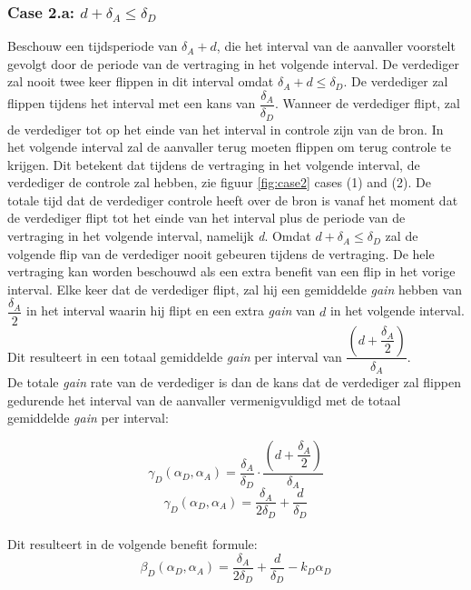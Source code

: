 \documentclass[master=cws, masteroption=vs,english]{kulemt}
\begin{document}
\begin{abstract*}
\subsubsection*{\textbf{Case 2.a:} $d + \delta_{A} \leq \delta_{D}$}
Beschouw een tijdsperiode van $\delta_{A} + d$, die het interval van de aanvaller voorstelt gevolgt door de periode van de vertraging in het volgende interval. De verdediger zal nooit twee keer flippen in dit interval omdat  $\delta_{A} + d \leq \delta_{D}$. De verdediger zal flippen tijdens het interval met een kans van $\dfrac{\delta_{A}}{\delta_{D}} $. Wanneer de verdediger flipt, zal de verdediger tot op het einde van het interval in controle zijn van de bron. In het volgende interval zal de aanvaller terug moeten flippen om terug controle te krijgen. Dit betekent dat tijdens de vertraging in het volgende interval, de verdediger de controle zal hebben, zie figuur  \ref{fig:case2} cases (1) and (2). De totale tijd dat de verdediger controle heeft over de bron is vanaf het moment dat de verdediger flipt tot het einde van het interval plus de periode van de vertraging in het volgende interval, namelijk \textit{d}. Omdat $d + \delta_{A} \leq \delta_{D}$  zal de volgende flip van de verdediger nooit gebeuren tijdens de vertraging. De hele vertraging kan worden beschouwd als een extra benefit van een flip in het vorige interval.
Elke keer dat de verdediger flipt, zal hij een gemiddelde \textit{gain} hebben van $\dfrac{\delta_{A}}{2}$ in het interval waarin hij flipt en een extra \textit{gain} van $d$ in het volgende interval. Dit resulteert in een totaal gemiddelde \textit{gain} per interval van
$\dfrac{(d+\dfrac{\delta_{A}}{2})}{\delta_{A}}$. \\

De totale \textit{gain} rate van de verdediger is dan de kans dat de verdediger zal flippen gedurende het interval van de aanvaller vermenigvuldigd met de totaal gemiddelde \textit{gain} per interval:


\begin{equation}\label{first}
\gamma_{D}(\alpha_{D},\alpha_{A}) = \dfrac{\delta_{A}}{\delta_{D}} \cdot \dfrac{(d+\dfrac{\delta_{A}}{2})}{\delta_{A}} 
\end{equation}
\begin{equation}\label{first}
\gamma_{D}(\alpha_{D},\alpha_{A}) = \dfrac{\delta_{A}}{2\delta_{D}} + \dfrac{d}{\delta_{D}} 
\end{equation}\\
Dit resulteert in de volgende benefit formule:
\begin{equation}\label{first}
\beta_{D}(\alpha_{D},\alpha_{A}) = \dfrac{\delta_{A}}{2\delta_{D}} + \dfrac{d}{\delta_{D}} - k_{D} \alpha_{D} 
\end{equation}\\


\end{abstract*}
\end{document}

